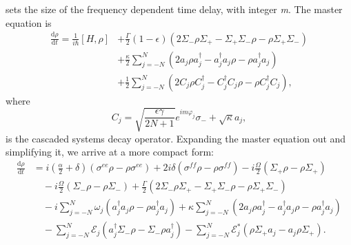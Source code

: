 \documentclass{article}
\begin{document}
sets the size of the frequency dependent time delay, with integer \textit{m}. The master equation is
\begin{align}\label{master_equation_full}
	\frac{\mathrm{d} \rho}{\mathrm{d} t} = \frac{1}{i \hbar} [H, \rho] &+ \frac{\Gamma}{2}(1 - \epsilon) \left(2 \Sigma_{-} \rho \Sigma_{+} - \Sigma_{+} \Sigma_{-} \rho - \rho \Sigma_{+} \Sigma_{-}\right) \nonumber \\
	&+ \frac{\kappa}{2} \sum_{j=-N}^{N} \left( 2 a_{j} \rho a^{\dagger}_{j} - a^{\dagger}_{j} a_{j} \rho - \rho a^{\dagger}_{j} a_{j} \right) \\
	&+ \frac{1}{2} \sum_{j=-N}^{N} \left(2 C_{j} \rho C^{\dagger}_{j} - C^{\dagger}_{j} C_{j} \rho - \rho C^{\dagger}_{j} C_{j} \right), \nonumber
\end{align}
where
\begin{equation}
	C_{j} = \sqrt{\frac{\epsilon \gamma}{2N+1}} e^{i m \varphi_{j}} \sigma_{-} + \sqrt{\kappa} a_{j},
\end{equation}
is the cascaded systems decay operator. Expanding the master equation out and simplifying it, we arrive at a more compact form:
\begin{align}
	\frac{\mathrm{d} \rho}{\mathrm{d} t} &= i \left( \frac{\alpha}{2} + \delta \right) \left( \sigma^{ee} \rho - \rho \sigma^{ee} \right) + 2 i \delta \left( \sigma^{ff} \rho - \rho \sigma^{ff} \right) - i \frac{\Omega}{2} \left( \Sigma_{+} \rho - \rho \Sigma_{+} \right) \nonumber \\
	&\quad  - i \frac{\Omega}{2} \left(\Sigma_{-} \rho - \rho \Sigma_{-}\right) + \frac{\Gamma}{2} \left( 2\Sigma_{-} \rho \Sigma_{+} - \Sigma_{+} \Sigma_{-} \rho - \rho \Sigma_{+} \Sigma_{-} \right) \nonumber \\
	&\quad - i \sum_{j=-N}^{N} \omega_{j} \left( a^{\dagger}_{j} a_{j} \rho - \rho a^{\dagger}_{j} a_{j} \right) + \kappa \sum_{j=-N}^{N} \left( 2 a_{j} \rho a^{\dagger}_{j} - a^{\dagger}_{j} a_{j} \rho - \rho a^{\dagger}_{j} a_{j} \right) \nonumber \\
	&\quad - \sum_{j=-N}^{N} \mathcal{E}_{j} \left( a^{\dagger}_{j} \Sigma_{-} \rho - \Sigma_{-} \rho a^{\dagger}_{j} \right) - \sum_{j=-N}^{N} \mathcal{E}_{j}^{*} \left( \rho \Sigma_{+} a_{j} - a_{j} \rho \Sigma_{+} \right) .
\end{align}
\end{document}
